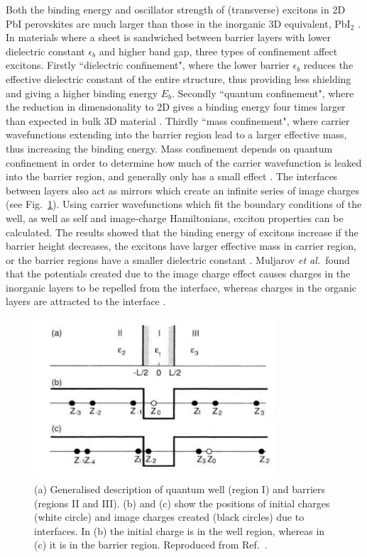 Both the binding energy and oscillator strength of (transverse) excitons in 2D PbI perovskites are much larger than those in the inorganic 3D equivalent, Pb$\textrm{I}_2$ \cite{Hirasawa1994}. In materials where a sheet is sandwiched between barrier layers with lower dielectric constant $\epsilon_b$ and higher band gap, three types of confinement affect excitons. Firstly ``dielectric confinement", where the lower barrier $\epsilon_b$ reduces the effective dielectric constant of the entire structure, thus providing less shielding and giving a higher binding energy $E_b$. Secondly ``quantum confinement", where the reduction in dimensionality to 2D gives a binding energy four times larger than expected in bulk 3D material \cite{Shinada1966}. Thirdly ``mass confinement", where carrier wavefunctions extending into the barrier region lead to a larger effective mass, thus increasing the binding energy. Mass confinement depends on quantum confinement in order to determine how much of the carrier wavefunction is leaked into the barrier region, and generally only has a small effect \cite{Kumagai1989}. The interfaces between layers also act as mirrors which create an infinite series of image charges (see Fig.\ \ref{2Fig17}). Using carrier wavefunctions which fit the boundary conditions of the well, as well as self and image-charge Hamiltonians, exciton properties can be calculated. The results showed that the binding energy of excitons increase if the barrier height decreases, the excitons have larger effective mass in carrier region, or the barrier regions have a smaller dielectric constant \cite{Kumagai1989}. Muljarov \textit{et al.}\ found that the potentials created due to the image charge effect causes charges in the inorganic layers to be repelled from the interface, whereas charges in the organic layers are attracted to the interface \cite{Muljarov1995}.

\begin{figure}[ht]
\centering
\includegraphics[width=0.8\textwidth]{Fig17}
\caption{(a) Generalised description of quantum well (region I) and barriers (regions II and III). (b) and (c) show the positions of initial charges (white circle) and image charges created (black circles) due to interfaces. In (b) the initial charge is in the well region, whereas in (c) it is in the barrier region. Reproduced from Ref.\ \cite{Kumagai1989}.}
\label{2Fig17}
\end{figure}


